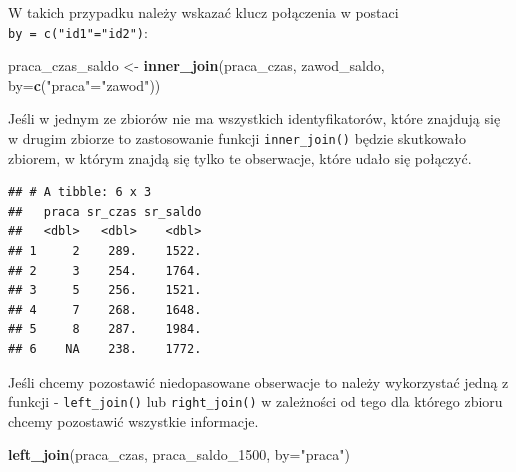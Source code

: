 \documentclass[]{book}
\newenvironment{Shaded}{\begin{snugshade}}{\end{snugshade}}
\newcommand{\KeywordTok}[1]{\textcolor[rgb]{0.13,0.29,0.53}{\textbf{#1}}}
\newcommand{\DataTypeTok}[1]{\textcolor[rgb]{0.13,0.29,0.53}{#1}}
\newcommand{\DecValTok}[1]{\textcolor[rgb]{0.00,0.00,0.81}{#1}}
\newcommand{\StringTok}[1]{\textcolor[rgb]{0.31,0.60,0.02}{#1}}
\newcommand{\OperatorTok}[1]{\textcolor[rgb]{0.81,0.36,0.00}{\textbf{#1}}}
\newcommand{\NormalTok}[1]{#1}
\begin{document}
W takich przypadku należy wskazać klucz połączenia w postaci
\texttt{by\ =\ c("id1"="id2")}:

\begin{Shaded}
\begin{Highlighting}[]
\NormalTok{praca_czas_saldo <-}\StringTok{ }\KeywordTok{inner_join}\NormalTok{(praca_czas, zawod_saldo, }\DataTypeTok{by=}\KeywordTok{c}\NormalTok{(}\StringTok{"praca"}\NormalTok{=}\StringTok{"zawod"}\NormalTok{))}
\end{Highlighting}
\end{Shaded}

Jeśli w jednym ze zbiorów nie ma wszystkich identyfikatorów, które
znajdują się w drugim zbiorze to zastosowanie funkcji
\texttt{inner\_join()} będzie skutkowało zbiorem, w którym znajdą się
tylko te obserwacje, które udało się połączyć.

\begin{Shaded}
\end{Shaded}

\begin{verbatim}
## # A tibble: 6 x 3
##   praca sr_czas sr_saldo
##   <dbl>   <dbl>    <dbl>
## 1     2    289.    1522.
## 2     3    254.    1764.
## 3     5    256.    1521.
## 4     7    268.    1648.
## 5     8    287.    1984.
## 6    NA    238.    1772.
\end{verbatim}

Jeśli chcemy pozostawić niedopasowane obserwacje to należy wykorzystać
jedną z funkcji - \texttt{left\_join()} lub \texttt{right\_join()} w
zależności od tego dla którego zbioru chcemy pozostawić wszystkie
informacje.

\begin{Shaded}
\begin{Highlighting}[]
\KeywordTok{left_join}\NormalTok{(praca_czas, praca_saldo_}\DecValTok{1500}\NormalTok{, }\DataTypeTok{by=}\StringTok{"praca"}\NormalTok{)}
\end{Highlighting}
\end{Shaded}
\end{document}
